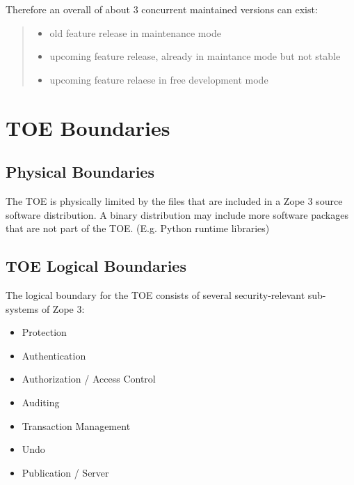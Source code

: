 \documentclass[12pt,english]{scrbook}
\begin{document}
Therefore an overall of about 3 concurrent maintained versions can exist:
\begin{quote}
\begin{itemize}
\item {} 
old feature release in maintenance mode

\item {} 
upcoming feature release, already in maintance mode but not stable

\item {} 
upcoming feature relaese in free development mode

\end{itemize}
\end{quote}





\section{TOE Boundaries}





\subsection{Physical Boundaries}

The TOE is physically limited by the files that are included in a Zope 3
source software distribution. A binary distribution may include more software
packages that are not part of the TOE. (E.g. Python runtime libraries)





\subsection{TOE Logical Boundaries}

The logical boundary for the TOE consists of several security-relevant sub-systems of
Zope 3:

\begin{itemize}
\item Protection

\item Authentication

\item Authorization / Access Control

\item Auditing

\item Transaction Management

\item Undo

\item Publication / Server

\end{itemize}
\end{document}
